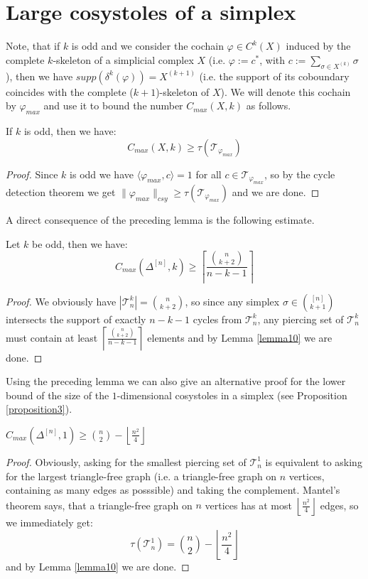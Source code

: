 \section{Large cosystoles of a simplex}

Note, that if \(k\) is odd and we consider the cochain \(\varphi\in C^k(X)\) induced by the complete \(k\)-skeleton of a simplicial complex \(X\) (i.e. \(\varphi:=c^*\), with \(c:=\sum\limits_{\sigma\in X^{(k)}}\sigma\)), then we have \(supp(\delta^k(\varphi))=X^{(k+1)}\) (i.e. the support of its coboundary coincides with the complete (\(k+1\))-skeleton of \(X\)). We will denote this cochain by \(\varphi_{max}\) and use it to bound the number \(C_{max}(X,k)\) as follows.

\begin{lem}\label{lemma10}
If \(k\) is odd, then we have:
\[
C_{max}(X,k)\geq\tau(\mathcal{T}_{\varphi_{max}})
\]
\begin{proof}
Since \(k\) is odd we have \(\langle\varphi_{max},c\rangle=1\) for all \(c\in \mathcal{T}_{\varphi_{max}}\), so by the cycle detection theorem we get \(\|\varphi_{max}\|_{csy}\geq\tau(\mathcal{T}_{\varphi_{max}})\) and we are done.
\end{proof}
\end{lem}

A direct consequence of the preceding lemma is the following estimate.

\begin{prop}\label{proposition11}
Let \(k\) be odd, then we have:
\[
C_{max}(\Delta^{[n]},k)\geq \left\lceil\frac{\binom{n}{k+2}}{n-k-1}\right\rceil
\]
\begin{proof}
We obviously have \(|\mathcal{T}_n^k|=\binom{n}{k+2}\), so since any simplex \(\sigma\in\binom{[n]}{k+1}\) intersects the support of exactly \(n-k-1\) cycles from \(\mathcal{T}_n^k\), any piercing set of \(\mathcal{T}_n^k\) must contain at least \(\left\lceil\frac{\binom{n}{k+2}}{n-k-1}\right\rceil\) elements and by Lemma \ref{lemma10} we are done.
\end{proof}
\end{prop}

Using the preceding lemma we can also give an alternative proof for the lower bound of the size of the \(1\)-dimensional cosystoles in a simplex (see Proposition \ref{proposition3}).

\begin{thm}\label{theorem10}
\(C_{max}(\Delta^{[n]},1)\geq\binom{n}{2}-\left\lfloor\frac{n^2}{4}\right\rfloor\)
\begin{proof}
Obviously, asking for the smallest piercing set of \(\mathcal{T}_n^1\) is equivalent to asking for the largest triangle-free graph (i.e. a triangle-free graph on \(n\) vertices, containing as many edges as posssible) and taking the complement. Mantel's theorem says, that a triangle-free graph on \(n\) vertices has at most \(\left\lfloor\frac{n^2}{4}\right\rfloor\) edges, so we immediately get:
\[
\tau(\mathcal{T}_n^1)=\binom{n}{2}-\left\lfloor\frac{n^2}{4}\right\rfloor
\]
and by Lemma \ref{lemma10} we are done.
\end{proof}
\end{thm}

